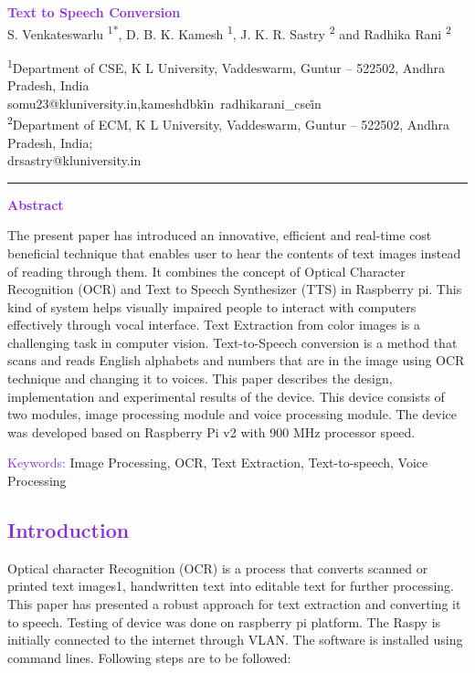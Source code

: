 \documentclass[a4paper]{article}
\begin{document}
\begin{flushright}
\huge
\textcolor{BlueViolet}
{\textbf{Text to Speech Conversion}}\\
\vspace{3mm} 
\large
S. Venkateswarlu \textsuperscript{1*}, D. B. K. Kamesh \textsuperscript{1}, J. K. R. Sastry \textsuperscript{2} and Radhika Rani \textsuperscript{2}

\small
\textsuperscript{1}Department of CSE, K L University, Vaddeswarm, Guntur – 522502, Andhra Pradesh, India\;\\

somu23@kluniversity.in,kameshdbk\@kluniversity\.in\, radhikarani\_cse\@kluniversity\.in \\

\textsuperscript{2}Department of ECM, K L University, Vaddeswarm, Guntur – 522502, Andhra Pradesh, India;\\
drsastry@kluniversity.in

\end{flushright}
\hrule

\large
\vspace{5mm}
\begin{flushleft}
\textcolor{BlueViolet}
{\textbf{Abstract}}\\
\end{flushleft}
\small
The present paper has introduced an innovative, efficient and real-time cost beneficial technique that enables user to hear the contents of text images instead of reading through them. It combines the concept of Optical Character Recognition (OCR) and Text to Speech Synthesizer (TTS) in Raspberry pi. This kind of system helps visually impaired people to interact with computers effectively through vocal interface. Text Extraction from color images is a challenging task in computer vision. Text-to-Speech conversion is a method that scans and reads English alphabets and numbers that are in the image using OCR technique and changing it to voices. This paper describes the design, implementation and experimental results of the device. This device consists of two modules, image processing module and voice processing module. The device was developed based on Raspberry Pi v2 with 900 MHz processor speed.

\vspace{5mm}
\large
\textcolor{BlueViolet}
{Keywords:}
\small
Image Processing, OCR, Text Extraction, Text-to-speech, Voice Processing

\textcolor{BlueViolet}
{\section{Introduction}}
\small
Optical character Recognition (OCR) is a process that converts scanned or printed text images1, handwritten text into editable text for further processing. This paper has presented a robust approach for text extraction and converting it to speech. Testing of device was done on raspberry pi platform. The Raspy is initially connected to the internet through VLAN. The software is installed using command lines. Following steps are to be followed:
\end{document}
